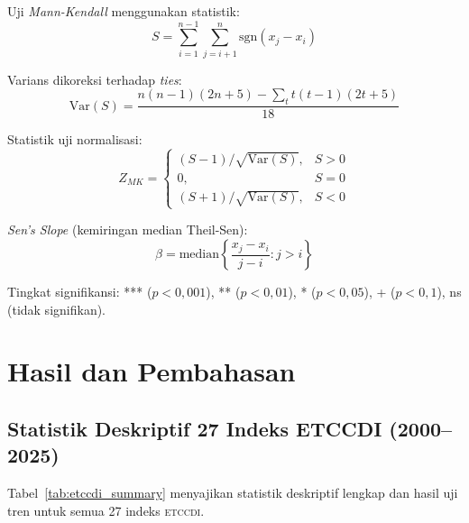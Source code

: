 \documentclass[12pt, a4paper]{article}
\newcommand{\etccdi}{\textsc{etccdi}}
\newcommand{\mk}{\textit{Mann-Kendall}}
\newcommand{\sens}{\textit{Sen's Slope}}
\begin{document}
Uji \mk{} menggunakan statistik:
\begin{equation}
  S = \sum_{i=1}^{n-1}\sum_{j=i+1}^{n} \text{sgn}(x_j - x_i)
\end{equation}

Varians dikoreksi terhadap \textit{ties}:
\begin{equation}
  \text{Var}(S) = \frac{n(n-1)(2n+5) - \sum_t t(t-1)(2t+5)}{18}
\end{equation}

Statistik uji normalisasi:
\begin{equation}
  Z_{MK} = \begin{cases}
    (S-1)/\sqrt{\text{Var}(S)}, & S > 0 \\
    0, & S = 0 \\
    (S+1)/\sqrt{\text{Var}(S)}, & S < 0
  \end{cases}
\end{equation}

\sens{} (kemiringan median Theil-Sen):
\begin{equation}
  \beta = \text{median}\left\{\frac{x_j - x_i}{j - i} : j > i\right\}
\end{equation}

Tingkat signifikansi: *** ($p < 0{,}001$), ** ($p < 0{,}01$), * ($p < 0{,}05$), + ($p < 0{,}1$), ns (tidak signifikan).

\section{Hasil dan Pembahasan}

\subsection{Statistik Deskriptif 27 Indeks ETCCDI (2000--2025)}

Tabel~\ref{tab:etccdi_summary} menyajikan statistik deskriptif lengkap dan hasil uji tren untuk semua 27 indeks \etccdi{}.
\end{document}
